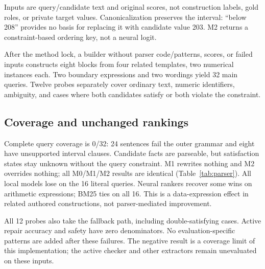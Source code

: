 \documentclass[conference,letterpaper]{IEEEtran}
\begin{document}
Inputs are query/candidate text and original scores, not construction labels, gold roles, or private target values. Canonicalization preserves the interval: ``below 208'' provides no basis for replacing it with candidate value 203. M2 returns a constraint-based ordering key, not a neural logit.

After the method lock, a builder without parser code/patterns, scores, or failed inputs constructs eight blocks from four related templates, two numerical instances each. Two boundary expressions and two wordings yield 32 main queries. Twelve probes separately cover ordinary text, numeric identifiers, ambiguity, and cases where both candidates satisfy or both violate the constraint.

\subsection{Coverage and unchanged rankings}
Complete query coverage is 0/32: 24 sentences fail the outer grammar and eight have unsupported interval clauses. Candidate facts are parseable, but satisfaction states stay unknown without the query constraint. M1 rewrites nothing and M2 overrides nothing; all M0/M1/M2 results are identical (Table~\ref{tab:parser}). All local models lose on the 16 literal queries. Neural rankers recover some wins on arithmetic expressions; BM25 ties on all 16. This is a data-expression effect in related authored constructions, not parser-mediated improvement.

All 12 probes also take the fallback path, including double-satisfying cases. Active repair accuracy and safety have zero denominators. No evaluation-specific patterns are added after these failures. The negative result is a coverage limit of this implementation; the active checker and other extractors remain unevaluated on these inputs.



\end{document}
